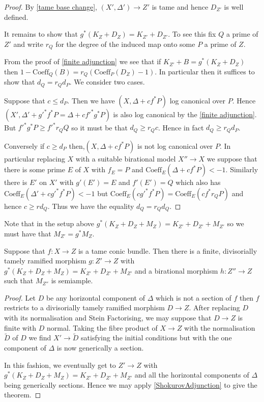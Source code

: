 \documentclass[a4paper,12pt]{book}
\begin{document}
\begin{proof}
	By \autoref{tame base change}, $(X',\Delta') \to Z'$ is tame and hence $D_{Z'}$ is well defined.
	
	It remains to show that $g^{*}(K_{Z}+D_{Z})=K_{Z'}+D_{Z'}$. To see this fix $Q$ a prime of $Z'$ and write $r_{Q}$ for the degree of the induced map onto some $P$ a prime of $Z$. 
	
	From the proof of \autoref{finite adjunction} we see that if $K_{Z'}+B=g^{*}(K_{Z}+D_{Z})$ then $1-\text{Coeff}_{Q}(B)=r_{Q}(\text{Coeff}_{P}(D_{Z})-1)$. In particular then it suffices to show that $d_{Q}=r_{Q}d_{P}$. We consider two cases.
	
	Suppose that $c \leq d_{P}$. Then we have $(X,\Delta+cf^{*}P)$ log canonical over $P$. Hence $(X',\Delta'+g'^{*}f^{*}P=\Delta+cf'^{*}g^{*}P)$ is also log canonical by the \autoref{finite adjunction}. But $f'^{*}g^{*}P \geq f'^{*}r_{Q}Q$ so it must be that $d_{Q} \geq r_{Q}c$. Hence in fact $d_{Q} \geq r_{Q}d_{P}$.
	
	Conversely if $c \geq d_{P}$ then,$(X,\Delta+cf^{*}P)$ is not log canonical over $P$. In particular replacing $X$ with a suitable birational model $X'' \to X$ we suppose that there is some prime $E$ of $X$ with $f_{E}=P$ and $\text{Coeff}_{E}(\Delta+cf^{*}P) < -1$. Similarly there is $E'$ on $X'$ with $g'(E')=E$ and $f'(E')=Q$ which also has $\text{Coeff}_{E}(\Delta'+cg'^{*}f^{*}P) < -1$ but $\text{Coeff}_{E}(cg'^{*}f^{*}P)=\text{Coeff}_{E}(cf^{*}r_{Q}P)$ and hence $c \geq rd_{Q}$. Thus we have the equality $d_{Q}=r_{Q}d_{Q}$.
\end{proof}


Note that in the setup above $g^{*}(K_{Z}+D_{Z}+M_{Z})=K_{Z'}+D_{Z'}+M_{Z'}$ so we must have that $M_{Z'}=g^{*}M_{Z}$.

\begin{lemma}
	Suppose that $f\colon X \to Z$ is a tame conic bundle. Then there is a finite, divisorially tamely ramified morphism $g\colon Z' \to Z$ with $g^{*}(K_{Z}+D_{Z}+M_{Z})=K_{Z'}+D_{Z'}+M_{Z'}$ and a birational morphism $h\colon Z'' \to Z$ such that $M_{Z''}$ is semiample.
\end{lemma}
\begin{proof}
	Let $D$ be any horizontal component of $\Delta$ which is not a section of $f$ then $f$ restricts to a divisorially tamely ramified morphism $D \to Z$. After replacing $D$ with its normalisation and Stein Factorising, we may suppose that $D\to Z$ is finite with $D$ normal. Taking the fibre product of $X \to Z$ with the normalisation $\tilde{D}$ of $D$ we find $X' \to \tilde{D}$ satisfying the initial conditions but with the one component of $\Delta$ is now  generically a section.
	
	 In this fashion, we eventually get to $Z' \to Z$ with $g^{*}(K_{Z}+D_{Z}+M_{Z})=K_{Z'}+D_{Z'}+M_{Z'}$ and all the horizontal components of $\Delta$ being generically sections. Hence we may apply \autoref{ShokurovAdjunction} to give the theorem.
\end{proof}
\end{document}
